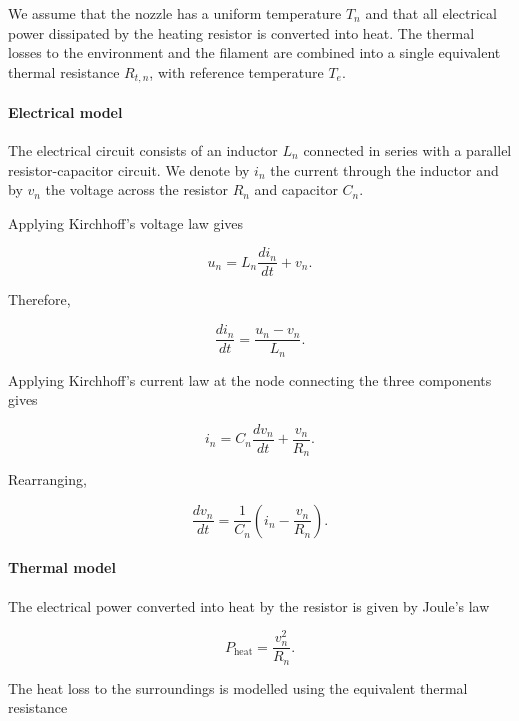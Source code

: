 \documentclass[a4paper,12pt]{article}
\begin{document}
We assume that the nozzle has a uniform temperature $T_n$ and that all electrical power dissipated by the heating resistor is converted into heat. The thermal losses to the environment and the filament are combined into a single equivalent thermal resistance $R_{t,n}$, with reference temperature $T_e$.

\paragraph{Electrical model}

The electrical circuit consists of an inductor $L_n$ connected in series with a parallel resistor-capacitor circuit. We denote by $i_n$ the current through the inductor and by $v_n$ the voltage across the resistor $R_n$ and capacitor $C_n$.

Applying Kirchhoff's voltage law gives

\begin{equation}
u_n = L_n\frac{di_n}{dt}+v_n.
\end{equation}

Therefore,

\begin{equation}
\frac{di_n}{dt}=\frac{u_n-v_n}{L_n}.
\end{equation}

Applying Kirchhoff's current law at the node connecting the three components gives

\begin{equation}
i_n=C_n\frac{dv_n}{dt}+\frac{v_n}{R_n}.
\end{equation}

Rearranging,

\begin{equation}
\frac{dv_n}{dt}
=\frac{1}{C_n}\left(i_n-\frac{v_n}{R_n}\right).
\end{equation}

\paragraph{Thermal model}

The electrical power converted into heat by the resistor is given by Joule's law

\begin{equation}
P_{\mathrm{heat}}=\frac{v_n^2}{R_n}.
\end{equation}

The heat loss to the surroundings is modelled using the equivalent thermal resistance
\end{document}
